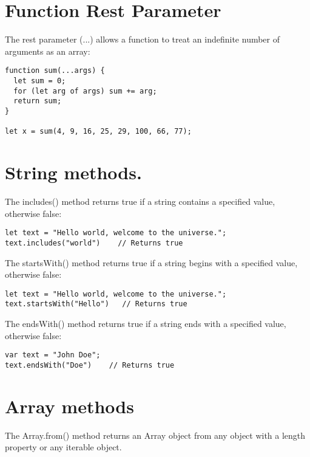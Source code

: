 \documentclass[a4paper,12pt]{article}
\begin{document}
\begin{large}
\section*{Function Rest Parameter}

The rest parameter (...) allows a function to treat an indefinite number of arguments as an array:

\begin{lstlisting}
function sum(...args) {
  let sum = 0;
  for (let arg of args) sum += arg;
  return sum;
}

let x = sum(4, 9, 16, 25, 29, 100, 66, 77);
\end{lstlisting}





\section*{String methods.}

The includes() method returns true if a string contains a specified value, otherwise false:

\begin{lstlisting}
let text = "Hello world, welcome to the universe.";
text.includes("world")    // Returns true
\end{lstlisting}

The startsWith() method returns true if a string begins with a specified value, otherwise false:

\begin{lstlisting}
let text = "Hello world, welcome to the universe.";
text.startsWith("Hello")   // Returns true
\end{lstlisting}

The endsWith() method returns true if a string ends with a specified value, otherwise false:

\begin{lstlisting}
var text = "John Doe";
text.endsWith("Doe")    // Returns true
\end{lstlisting}





\section*{Array methods}

The Array.from() method returns an Array object from any object with a length property or any iterable object.


\end{large}
\end{document}
